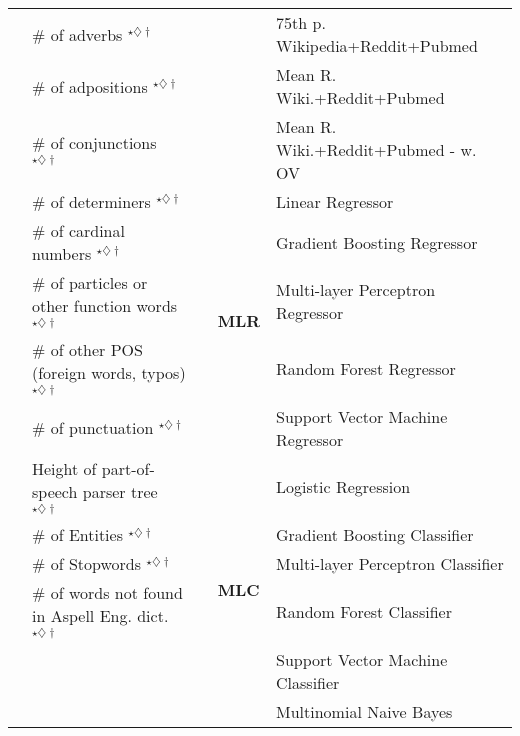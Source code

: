 \begin{table}[tb]
{\begin{tabular}{llcll}
 & \# of adverbs $^{\star\diamondsuit\dagger}$ &  &  & 75th p. Wikipedia+Reddit+Pubmed \tabularnewline
 & \# of adpositions $^{\star\diamondsuit\dagger}$ &  &  & Mean R. Wiki.+Reddit+Pubmed \tabularnewline 
 & \# of conjunctions $^{\star\diamondsuit\dagger}$ & &  & Mean R. Wiki.+Reddit+Pubmed - w. OV \tabularnewline
\cline{4-5} 
 & \# of determiners $^{\star\diamondsuit\dagger}$ & & \multirow{5}{*}{\textbf{MLR}} & Linear Regressor\tabularnewline  
 & \# of cardinal numbers $^{\star\diamondsuit\dagger}$ &  &  & Gradient Boosting Regressor\tabularnewline
 & \# of particles or other function words $^{\star\diamondsuit\dagger}$ &  &  & Multi-layer Perceptron Regressor\tabularnewline
 & \# of other POS (foreign words, typos) $^{\star\diamondsuit\dagger}$ &  &  & Random Forest Regressor\tabularnewline
 & \# of punctuation $^{\star\diamondsuit\dagger}$ &  &  & Support Vector Machine Regressor\tabularnewline
\cline{4-5} 
 & Height of part-of-speech parser tree $^{\star\diamondsuit\dagger}$ &  &  \multirow{6}{*}{\textbf{MLC}} & Logistic Regression\tabularnewline
 & \# of Entities $^{\star\diamondsuit\dagger}$ &  &  & Gradient Boosting Classifier\tabularnewline
 & \# of Stopwords $^{\star\diamondsuit\dagger}$ &  &  & Multi-layer Perceptron Classifier\tabularnewline
 & \# of words not found in Aspell Eng. dict. $^{\star\diamondsuit\dagger}$ &  &  & Random Forest Classifier\tabularnewline
 &  &  &  & Support Vector Machine Classifier\tabularnewline
 &  &  &  & Multinomial Naive Bayes\tabularnewline
\cline{1-2} \cline{4-5} 
\end{tabular}
}
\vspace{-10pt}
\end{table}
